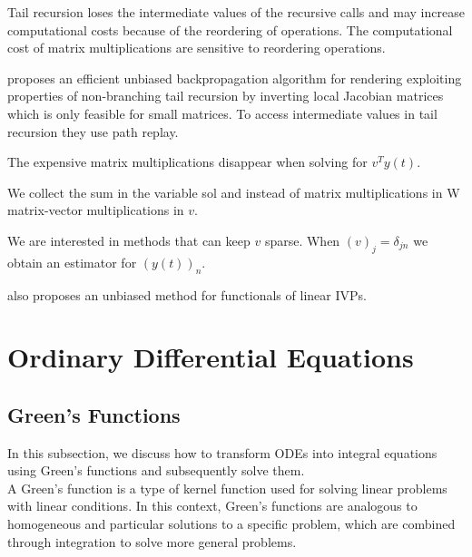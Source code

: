 \documentclass[a4paper,12pt]{article}
\begin{document}
Tail recursion loses the intermediate values
of the recursive calls and
may increase computational costs because of the reordering of operations.
The computational cost of matrix multiplications are sensitive
to reordering operations.

\begin{related}[Non-branching tail recursion]
  \cite{vicini_path_2021} proposes an efficient unbiased backpropagation
  algorithm for rendering exploiting properties of non-branching tail recursion
  by inverting local Jacobian matrices which is only feasible for small matrices.
  To access intermediate values in tail recursion they use path replay.
\end{related}


The expensive matrix multiplications disappear when solving for $v^{T}y(t)$.

\begin{julia} \label{jl:adjoint main poisson}
  We collect the sum in the variable sol and instead of matrix multiplications in W
  matrix-vector multiplications in $v$.


  We are interested in methods that can keep $v$ sparse.
  When $(v)_{j} = \delta_{jn}$ we obtain an estimator for $(y(t))_{n}$.
\end{julia}

\begin{related}
  \cite{ermakov_monte_2021}  also proposes an unbiased method for functionals of linear IVPs.
\end{related}
\newpage

\section{Ordinary Differential Equations}

\subsection{Green's Functions}
\label{sec:greens functions}

In this subsection, we discuss how to transform ODEs into integral equations using Green's functions and
subsequently solve them. \\

A Green's function is a type of kernel function used
for solving linear problems with linear conditions. In this context,
Green's functions are analogous to homogeneous and particular solutions
to a specific problem, which are combined through integration to solve
more general problems.
\end{document}
